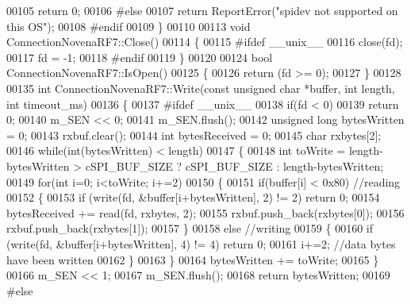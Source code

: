 \begin{DoxyCode}
{{{{00105     \textcolor{keywordflow}{return} 0;
00106 \textcolor{preprocessor}{#else}
00107     \textcolor{keywordflow}{return} ReportError(\textcolor{stringliteral}{"spidev not supported on this OS"});
00108 \textcolor{preprocessor}{#endif}
00109 \}
00110 
00113 \textcolor{keywordtype}{void} ConnectionNovenaRF7::Close()
00114 \{
00115 \textcolor{preprocessor}{#ifdef \_\_unix\_\_}
00116     close(fd);
00117     fd = -1;
00118 \textcolor{preprocessor}{#endif}
00119 \}
00120 
00124 \textcolor{keywordtype}{bool} ConnectionNovenaRF7::IsOpen()
00125 \{
00126     \textcolor{keywordflow}{return} (fd >= 0);
00127 \}
00128 
00135 \textcolor{keywordtype}{int} ConnectionNovenaRF7::Write(\textcolor{keyword}{const} \textcolor{keywordtype}{unsigned} \textcolor{keywordtype}{char} *buffer, \textcolor{keywordtype}{int} length, \textcolor{keywordtype}{int} 
      timeout_ms)
00136 \{
00137 \textcolor{preprocessor}{    #ifdef \_\_unix\_\_}
00138     \textcolor{keywordflow}{if}(fd < 0)
00139         \textcolor{keywordflow}{return} 0;
00140     m\_SEN << 0;
00141     m\_SEN.flush();
00142     \textcolor{keywordtype}{unsigned} \textcolor{keywordtype}{long} bytesWritten = 0;
00143     rxbuf.clear();
00144     \textcolor{keywordtype}{int} bytesReceived = 0;
00145     \textcolor{keywordtype}{char} rxbytes[2];
00146     \textcolor{keywordflow}{while}(\textcolor{keywordtype}{int}(bytesWritten) < length)
00147     \{
00148         \textcolor{keywordtype}{int} toWrite = length-bytesWritten > cSPI\_BUF\_SIZE ? cSPI\_BUF\_SIZE : length-bytesWritten;
00149         \textcolor{keywordflow}{for}(\textcolor{keywordtype}{int} i=0; i<toWrite; i+=2)
00150         \{
00151             \textcolor{keywordflow}{if}(buffer[i] < 0x80) \textcolor{comment}{//reading}
00152             \{
00153                 \textcolor{keywordflow}{if} (write(fd, &buffer[i+bytesWritten], 2) != 2) \textcolor{keywordflow}{return} 0;
00154                 bytesReceived += read(fd, rxbytes, 2);
00155                 rxbuf.push\_back(rxbytes[0]);
00156                 rxbuf.push\_back(rxbytes[1]);
00157             \}
00158             \textcolor{keywordflow}{else} \textcolor{comment}{//writing}
00159             \{
00160                 \textcolor{keywordflow}{if} (write(fd, &buffer[i+bytesWritten], 4) != 4) \textcolor{keywordflow}{return} 0;
00161                 i+=2; \textcolor{comment}{//data bytes have been written}
00162             \}
00163         \}
00164         bytesWritten += toWrite;
00165     \}
00166     m\_SEN << 1;
00167     m\_SEN.flush();
00168     \textcolor{keywordflow}{return} bytesWritten;
00169 \textcolor{preprocessor}{#else}
}}}}
\end{DoxyCode}
